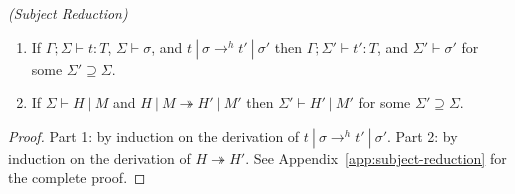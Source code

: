 \begin{thm}
\emph{(Subject Reduction)}\label{th:subject-reduction}

\begin{enumerate}

\item If $\Gamma ; \Sigma \vdash t : T$, $\Sigma \vdash \sigma$, and $t~|~\sigma \rightarrow^h t'~|~\sigma'$ then $\Gamma ; \Sigma' \vdash t' : T$, and $\Sigma' \vdash \sigma'$ for some $\Sigma' \supseteq \Sigma$.

\item If $\Sigma \vdash H~|~M$ and $H~|~M \twoheadrightarrow H'~|~M'$ then $\Sigma' \vdash H'~|~M'$ for some $\Sigma' \supseteq \Sigma$.

\end{enumerate}

\end{thm}
\begin{proof}
  Part 1: by induction on the derivation of $t~|~\sigma \rightarrow^h
  t'~|~\sigma'$. Part 2: by induction on the derivation of $H
  \twoheadrightarrow H'$. See Appendix~\ref{app:subject-reduction} for
  the complete proof.
\end{proof}



